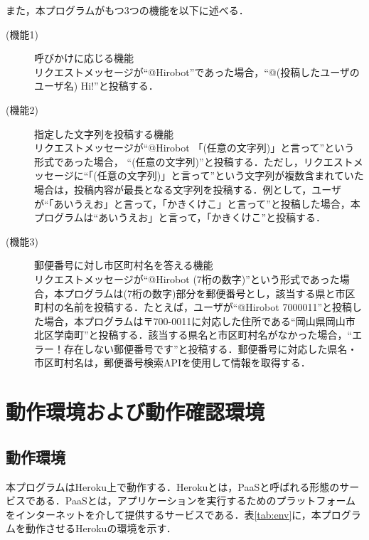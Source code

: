 \documentclass[12pt]{jsarticle}
\begin{document}
\newpage

また，本プログラムがもつ3つの機能を以下に述べる．

\begin{description}
\item[(機能1)]\label{func1} 呼びかけに応じる機能\\
  リクエストメッセージが``@Hirobot''であった場合，``@(投稿したユーザのユーザ名) Hi!''と投稿する．
\item[(機能2)]\label{func2} 指定した文字列を投稿する機能\\
  リクエストメッセージが``@Hirobot 「(任意の文字列)」と言って''という形式であった場合， ``(任意の文字列)''と投稿する．ただし，リクエストメッセージに``「(任意の文字列)」と言って''という文字列が複数含まれていた場合は，投稿内容が最長となる文字列を投稿する．例として，ユーザが``「あいうえお」と言って，「かきくけこ」と言って''と投稿した場合，本プログラムは``あいうえお」と言って，「かきくけこ''と投稿する．
\item[(機能3)]\label{func3} 郵便番号に対し市区町村名を答える機能\\
  リクエストメッセージが``@Hirobot (7桁の数字)''という形式であった場合，本プログラムは(7桁の数字)部分を郵便番号とし，該当する県と市区町村の名前を投稿する．たとえば，ユーザが``@Hirobot 7000011''と投稿した場合，本プログラムは〒700-0011に対応した住所である``岡山県岡山市北区学南町''と投稿する．該当する県名と市区町村名がなかった場合，``エラー！存在しない郵便番号です''と投稿する．郵便番号に対応した県名・市区町村名は，郵便番号検索API\cite{postalAPI}を使用して情報を取得する．
\end{description}

\newpage
\section{動作環境および動作確認環境}\label{sec:env}
\subsection{動作環境}
本プログラムはHeroku\cite{heroku}上で動作する．Herokuとは，PaaSと呼ばれる形態のサービスである．PaaSとは，アプリケーションを実行するためのプラットフォームをインターネットを介して提供するサービスである．表\ref{tab:env}に，本プログラムを動作させるHerokuの環境を示す．
\end{document}
